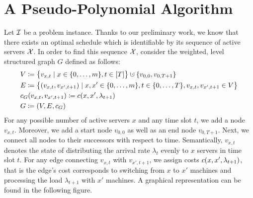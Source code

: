 \section{A Pseudo-Polynomial Algorithm}\label{sec:opt_offline_pseudo_poly}
Let $\mathcal{I}$ be a problem instance. Thanks to our preliminary work, we know that there exists an optimal schedule which is identifiable by its sequence of active servers $\mathcal{X}$. In order to find this sequence $\mathcal{X}$, consider the weighted, level structured graph $G$ defined as follows:
\begin{align*}
	&V\coloneqq\bigl\{v_{x,t}\mid x\in\fromto{0}{m},t\in[T]\bigr\}\dotcup\{v_{0,0},v_{0,T+1}\}\\
	&E\coloneqq\bigl\{(v_{x,t},v_{x',t+1})\mid x,x'\in\fromto{0}{m},t\in\fromto{0}{T},v_{x,t},v_{x',t+1}\in V\bigr\}\\
	&c_G(v_{x,t},v_{x',t+1})\coloneqq\costs(x,x',\lambda_{t+1})\\
	&G\coloneqq(V,E,c_G)
\end{align*}
For any possible number of active servers $x$ and any time slot $t$, we add a node $v_{x,t}$. Moreover, we add a start node $v_{0,0}$ as well as an end node $v_{0,T+1}$. Next, we connect all nodes to their successors with respect to time. Semantically, $v_{x,t}$ denotes the state of distributing the arrival rate $\lambda_{t}$ evenly to $x$ servers in time slot $t$. For any edge connecting $v_{x,t}$ with $v_{x',t+1}$, we assign costs $c(x,x',\lambda_{t+1})$, that is the edge's cost corresponds to switching from $x$ to $x'$ machines and processing the load $\lambda_{t+1}$ with $x'$ machines. A graphical representation can be found in the following figure.
